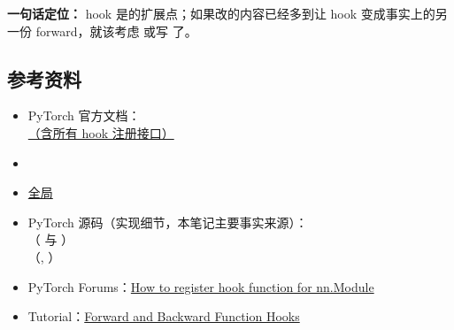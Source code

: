 \begin{summarybox}
\textbf{一句话定位：} hook 是的扩展点；如果改的内容已经多到让 hook 变成事实上的另一份 forward，就该考虑  或写  了。
\end{summarybox}

\subsection{参考资料}

\begin{itemize}[leftmargin=1.5em]
  \item PyTorch 官方文档：\\
        \href{https://pytorch.org/docs/stable/generated/torch.nn.Module.html}{（含所有 hook 注册接口）}
  \item \href{https://pytorch.org/docs/stable/generated/torch.Tensor.register_hook.html}{}
  \item \href{https://pytorch.org/docs/stable/generated/torch.nn.modules.module.register_module_forward_hook.html}{全局 }
  \item PyTorch 源码（实现细节，本笔记主要事实来源）：\\
        （ 与 ）\\
        （, ）
  \item PyTorch Forums：\href{https://discuss.pytorch.org/t/how-to-register-hook-function-for-nn-module/4979}{How to register hook function for nn.Module}
  \item Tutorial：\href{https://pytorch.org/tutorials/beginner/former_torchies/nnft_tutorial.html}{Forward and Backward Function Hooks}
\end{itemize}
